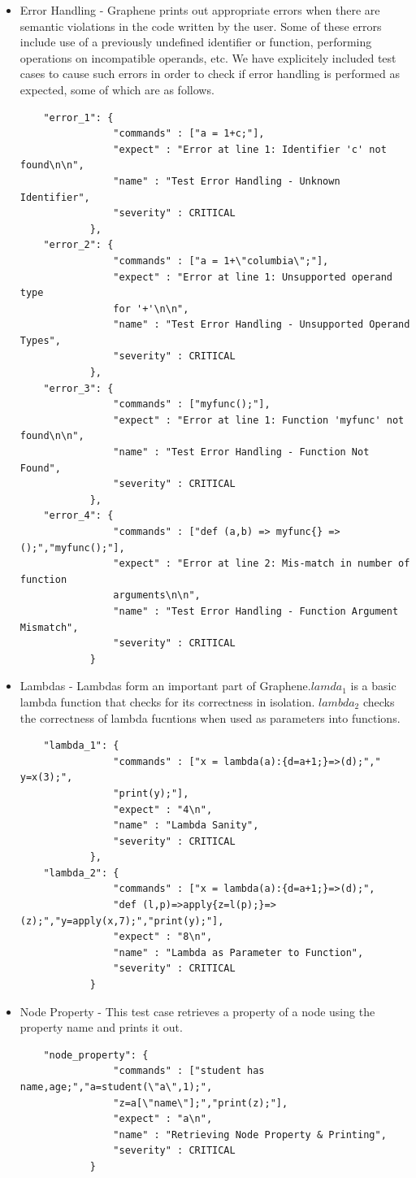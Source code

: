 \documentclass[a4paper]{article}
\begin{document}
\begin{itemize}
\item Error Handling - Graphene prints out appropriate errors when there are semantic violations in the code written by the user. Some of these errors include use of a previously undefined identifier or function, performing operations on incompatible operands, etc. We have explicitely included test cases to cause such errors in order to check if error handling is performed as expected, some of which are as follows. 
\begin{verbatim}
	"error_1": { 
                "commands" : ["a = 1+c;"],
                "expect" : "Error at line 1: Identifier 'c' not found\n\n",
                "name" : "Test Error Handling - Unknown Identifier",
                "severity" : CRITICAL
            },
    "error_2": { 
                "commands" : ["a = 1+\"columbia\";"],
                "expect" : "Error at line 1: Unsupported operand type
                for '+'\n\n",
                "name" : "Test Error Handling - Unsupported Operand Types",
                "severity" : CRITICAL
            },
    "error_3": { 
                "commands" : ["myfunc();"],
                "expect" : "Error at line 1: Function 'myfunc' not found\n\n",
                "name" : "Test Error Handling - Function Not Found",
                "severity" : CRITICAL
            },
    "error_4": { 
                "commands" : ["def (a,b) => myfunc{} => ();","myfunc();"],
                "expect" : "Error at line 2: Mis-match in number of function
                arguments\n\n",
                "name" : "Test Error Handling - Function Argument Mismatch",
                "severity" : CRITICAL
            }
\end{verbatim}
\item Lambdas - Lambdas form an important part of Graphene.$lamda_1$ is a basic lambda function that checks for its correctness in isolation. $lambda_2$ checks the correctness of lambda fucntions when used as parameters into functions.
\begin{verbatim}
    "lambda_1": { 
                "commands" : ["x = lambda(a):{d=a+1;}=>(d);"," y=x(3);",
                "print(y);"],
                "expect" : "4\n",
                "name" : "Lambda Sanity",
                "severity" : CRITICAL
            },
    "lambda_2": { 
                "commands" : ["x = lambda(a):{d=a+1;}=>(d);",
                "def (l,p)=>apply{z=l(p);}=>(z);","y=apply(x,7);","print(y);"],
                "expect" : "8\n",
                "name" : "Lambda as Parameter to Function",
                "severity" : CRITICAL
            }
\end{verbatim}
\item Node Property - This test case retrieves a property of a node using the property name and prints it out.
\begin{verbatim}
	"node_property": { 
                "commands" : ["student has name,age;","a=student(\"a\",1);",
                "z=a[\"name\"];","print(z);"],
                "expect" : "a\n",
                "name" : "Retrieving Node Property & Printing",
                "severity" : CRITICAL
            }
\end{verbatim}


\end{itemize}
\end{document}

